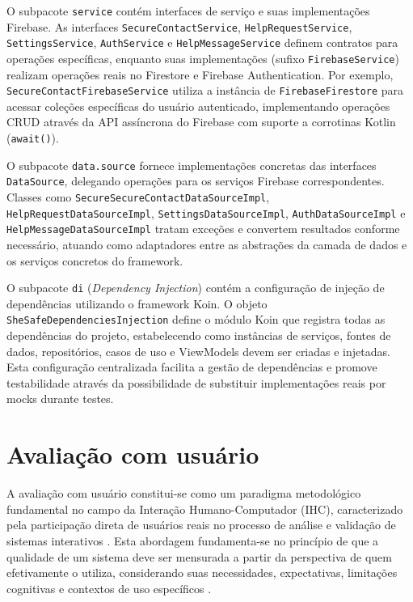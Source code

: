 O subpacote \texttt{service} contém interfaces de serviço e suas implementações Firebase. As interfaces \texttt{SecureContactService}, \texttt{HelpRequestService}, \texttt{SettingsService}, \texttt{AuthService} e \texttt{HelpMessageService} definem contratos para operações específicas, enquanto suas implementações (sufixo \texttt{FirebaseService}) realizam operações reais no Firestore e Firebase Authentication. Por exemplo, \texttt{SecureContactFirebaseService} utiliza a instância de \texttt{FirebaseFirestore} para acessar coleções específicas do usuário autenticado, implementando operações CRUD através da API assíncrona do Firebase com suporte a corrotinas Kotlin (\texttt{await()}).

O subpacote \texttt{data.source} fornece implementações concretas das interfaces \texttt{DataSource}, delegando operações para os serviços Firebase correspondentes. Classes como \texttt{SecureSecureContactDataSourceImpl}, \texttt{HelpRequestDataSourceImpl}, \texttt{SettingsDataSourceImpl}, \texttt{AuthDataSourceImpl} e \texttt{HelpMessageDataSourceImpl} tratam exceções e convertem resultados conforme necessário, atuando como adaptadores entre as abstrações da camada de dados e os serviços concretos do framework.

O subpacote \texttt{di} (\textit{Dependency Injection}) contém a configuração de injeção de dependências utilizando o framework Koin. O objeto \texttt{SheSafeDependenciesInjection} define o módulo Koin que registra todas as dependências do projeto, estabelecendo como instâncias de serviços, fontes de dados, repositórios, casos de uso e ViewModels devem ser criadas e injetadas. Esta configuração centralizada facilita a gestão de dependências e promove testabilidade através da possibilidade de substituir implementações reais por mocks durante testes.
\section{Avaliação com usuário}
A avaliação com usuário constitui-se como um paradigma metodológico fundamental no campo da Interação Humano-Computador (IHC), caracterizado pela participação direta de usuários reais no processo de análise e validação de sistemas interativos \cite{dix2003human}. Esta abordagem fundamenta-se no princípio de que a qualidade de um sistema deve ser mensurada a partir da perspectiva de quem efetivamente o utiliza, considerando suas necessidades, expectativas, limitações cognitivas e contextos de uso específicos \cite{preece2015interaction}.


